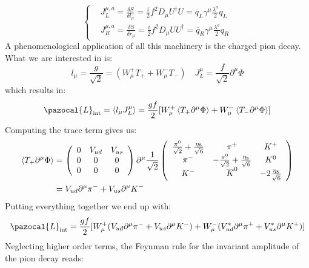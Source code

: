 \documentclass[../main.tex]{subfiles}
\begin{document}
\[
\left\{
\begin{aligned}
&J_L^{\mu,a}=\frac{\delta S}{\delta l_\mu}=\frac{i}{2}f^2D_\mu U^\dagger U=\overline{q}_L\gamma^\mu\frac{\lambda^a}{2}q_L\\
&J_R^{\mu,a}=\frac{\delta S}{\delta r_\mu}=\frac{i}{2}f^2D_\mu UU^\dagger=\overline{q}_R\gamma^\mu\frac{\lambda^a}{2}q_R
\end{aligned}
\right.
\]
A phenomenological application of all this machinery is the charged pion decay. What we are interested in is:
\[
l_\mu=\frac{g}{\sqrt{2}}=(W_\mu^+T_++W_\mu^-T_-) \quad J_L^\mu=\frac{f}{\sqrt{2}}\partial^\mu\Phi
\]
which results in:
\[
\pazocal{L}_{\text{int}}=\Braket{l_\mu J^\mu_L}=\frac{gf}{2}[W_\mu^+\Braket{T_+\partial^\mu\Phi}+W_\mu^-\Braket{T_-\partial^\mu\Phi}]
\]
Computing the trace term gives us:
\begin{align*}
\Braket{T_+\partial^\mu\Phi}&=\left(\begin{array}{ccc}
    0 & V_{ud} & V_{us} \\
    0 & 0 & 0 \\
    0 & 0 & 0
\end{array}\right)\partial^\mu\frac{1}{\sqrt{2}}\left(\begin{array}{ccc}
    \frac{\pi^0}{\sqrt{2}}+\frac{\eta_8}{\sqrt{6}} & \pi^+ & K^+ \\
    \pi^- & -\frac{\pi^0}{\sqrt{2}}+\frac{\eta_8}{\sqrt{6}} & K^0 \\
    K^- & \overline{K}^0 & -2\frac{\eta_8}{\sqrt{6}} \\
\end{array}\right)\\
&=V_{ud}\partial^\mu\pi^-+V_{us}\partial^\mu K^-
\end{align*}
Putting everything together we end up with:
\[
\pazocal{L}_{\text{int}}=\frac{gf}{2}[W_\mu^+(V_{ud}\partial^\mu\pi^-+V_{us}\partial^\mu K^-)+W_\mu^-(V_{ud}^*\partial^\mu\pi^++V_{us}^*\partial^\mu K^+)]
\]
Neglecting higher order terms, the Feynman rule for the invariant amplitude of the pion decay reads:
\end{document}
